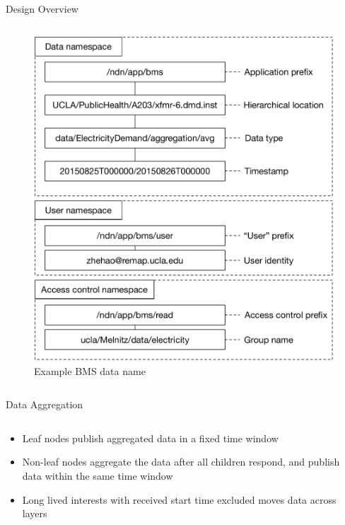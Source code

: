\documentclass[final,hyperref={pdfpagelabels=false},16pt]{beamer}
\begin{document}
\begin{frame}[t]
\begin{columns}[t]
\begin{column}{.465\textwidth}
\begin{block}{Design Overview}
\begin{columns}[T]
\begin{column}{.55\textwidth}
\begin{figure}
\includegraphics[width=\linewidth]{bms-example-name}
\caption{Example BMS data name}
\label{fig:example-name}
\end{figure}
\end{column}

\end{columns}

\end{block}


\begin{block}{Data Aggregation}

\begin{columns}[T]

\begin{column}{.42\textwidth}
\begin{itemize}
\item{Leaf nodes publish aggregated data in a fixed time window}
\item{Non-leaf nodes aggregate the data after all children respond, and publish data within the same time window}
\item{Long lived interests with received start time excluded moves data across layers}
\end{itemize}
\end{column}


\end{columns}
\end{block}
\end{column}
\end{columns}
\end{frame}
\end{document}
